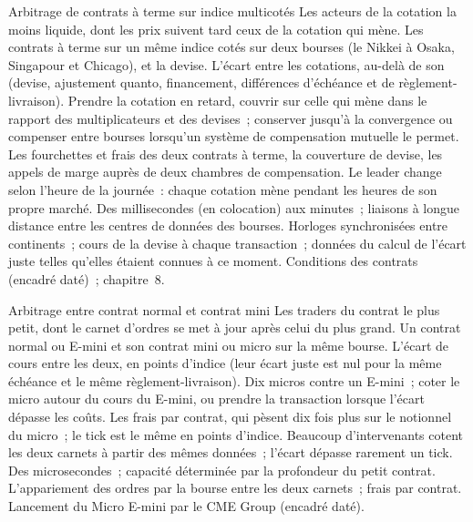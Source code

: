\begin{strategyfile}{Arbitrage de contrats à terme sur indice multicotés}\label{strat:hf:index-and-basket-arbitrage:cross}
 Les acteurs de la cotation la moins liquide, dont les prix suivent tard ceux de la cotation qui mène.
 Les contrats à terme sur un même indice cotés sur deux bourses (le Nikkei à Osaka, Singapour et Chicago), et la devise.
 L'écart entre les cotations, au-delà de son  (devise, ajustement quanto, financement, différences d'échéance et de règlement-livraison).
 Prendre la cotation en retard, couvrir sur celle qui mène dans le rapport des multiplicateurs et des devises~; conserver jusqu'à la convergence ou compenser
entre bourses lorsqu'un système de compensation mutuelle le permet.
 Les fourchettes et frais des deux contrats à terme, la couverture de devise, les appels de marge auprès de deux chambres de compensation.
 Le leader change selon l'heure de la journée~: chaque cotation mène pendant les heures de son propre marché.
 Des millisecondes (en colocation) aux minutes~; liaisons à longue distance entre les centres de données des bourses.
 Horloges synchronisées entre continents~; cours de la devise à chaque transaction~; données du calcul de l'écart juste telles qu'elles étaient connues à ce moment.
 Conditions des contrats (encadré daté)~; chapitre~8.
\end{strategyfile}

\begin{strategyfile}{Arbitrage entre contrat normal et contrat mini}\label{strat:hf:index-and-basket-arbitrage:mini}
 Les traders du contrat le plus petit, dont le carnet d'ordres se met à jour après celui du plus grand.
 Un contrat normal ou E-mini et son contrat mini ou micro sur la même bourse.
 L'écart de cours entre les deux, en points d'indice (leur écart juste est nul pour la même échéance et le même règlement-livraison).
 Dix micros contre un E-mini~; coter le micro autour du cours du E-mini, ou prendre la transaction lorsque l'écart dépasse les coûts.
 Les frais par contrat, qui pèsent dix fois plus sur le notionnel du micro~; le tick est le même en points d'indice.
 Beaucoup d'intervenants cotent les deux carnets à partir des mêmes données~; l'écart dépasse rarement un tick.
 Des microsecondes~; capacité déterminée par la profondeur du petit contrat.
 L'appariement des ordres par la bourse entre les deux carnets~; frais par contrat.
 Lancement du Micro E-mini par le CME Group (encadré daté).
\end{strategyfile}


